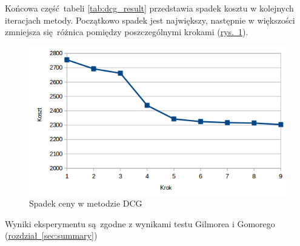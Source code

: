 Końcowa część tabeli \ref{tab:dcg_result} przedstawia spadek kosztu w kolejnych iteracjach metody. Początkowo spadek jest największy, następnie w większości zmniejsza się różnica pomiędzy poszczególnymi krokami (\hyperref[fig:regression]{rys.~\ref*{fig:regression}}).

\begin{figure}[h]
  \includegraphics[width=\textwidth]{../image/dcg_regression.png}
  \caption{Spadek ceny w metodzie DCG}
  \label{fig:regression}
\end{figure}

Wyniki eksperymentu są zgodne z wynikami testu Gilmorea i Gomorego (\hyperref[sec:dcg]{rozdział~\ref*{sec:summary}})
